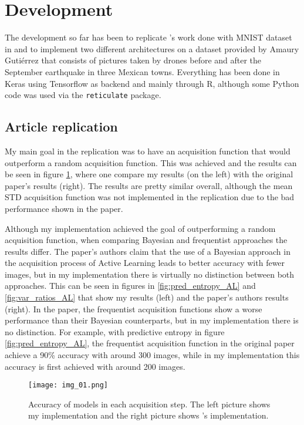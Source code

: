 \section{Development}

The development so far has been to replicate \citeauthor{Gal2016Active}'s work done with MNIST dataset in  and to implement two different architectures on a dataset provided by Amaury Gutiérrez that consists of pictures taken by drones before and after the September earthquake in three Mexican towns. Everything has been done in Keras using Tensorflow as backend and mainly through R, although some Python code was used via the \texttt{reticulate} package.

\subsection{Article replication}

My main goal in the replication  was to have an acquisition function that would outperform a random acquisition function. This was achieved and the results can be seen in figure \ref{fig:comparison_active_learning_random}, where one compare my results (on the left) with the original paper's results (right). The results are pretty similar overall, although the mean STD acquisition function was not implemented in the replication due to the bad performance shown in the paper.

Although my implementation achieved the goal of outperforming a random acquisition function, when comparing Bayesian and frequentist approaches the results differ. The paper's authors claim that the use of a Bayesian approach in the acquisition process of Active Learning leads to better accuracy with fewer images, but in my implementation there is virtually no distinction between both approaches. This can be seen in figures in \ref{fig:pred_entropy_AL} and \ref{fig:var_ratios_AL} that show my results (left) and the paper's authors results (right). In the paper, the frequentist acquisition functions show a worse performance than their Bayesian counterparts, but in my implementation there is no distinction. For example, with predictive entropy in figure \ref{fig:pred_entropy_AL}, the frequentist acquisition function in the original paper achieve a 90\% accuracy with around 300 images, while in my implementation this accuracy is first achieved with around 200 images.


\begin{figure}[H]
    \centering
    \texttt{[image: img\_01.png]}
    \caption{Accuracy of models in each acquisition step. The left picture shows my implementation and the right picture shows \citeauthor{Gal2016Active}'s implementation.}
    \label{fig:comparison_active_learning_random}
\end{figure}

